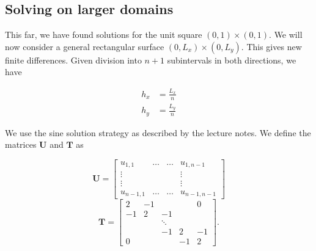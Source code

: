 
\subsection{Solving on larger domains}
This far, we have found solutions for the unit square $(0, 1) \times (0,1)$. We will now consider a general rectangular surface $(0, L_x) \times (0,L_y)$. This gives new finite differences. Given division into $n+1$ subintervals in both directions, we have






\begin{align}
h_x &= \frac{L_x}{n} \\
h_y &= \frac{L_y}{n}
\end{align}

We use the sine solution strategy as described by the lecture notes. We define the matrices $\mathbf{U}$ and $\mathbf{T}$ as

\begin{equation}
  \mathbf{{U}} = 
  \begin{bmatrix}
    u_{1,1} & \ldots & \ldots & u_{1,n-1} \\
    \vdots & & & \vdots \\
    \vdots & & & \vdots \\
    u_{n-1,1} & \ldots & \ldots & u_{n-1,n-1}
  \end{bmatrix}
\end{equation}
\begin{equation}
  \mathbf{{T}} = 
  \begin{bmatrix}
    2 & -1 & & & 0 \\
    -1 & 2 & -1 & & \\
    & & \ddots & & \\
    & & -1 & 2 & -1 \\
    0 & & & -1 & 2
  \end{bmatrix}.
\end{equation}

